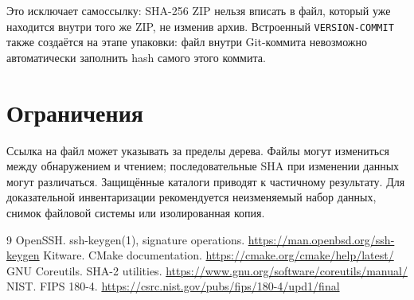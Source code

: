 \documentclass[12pt,a4paper]{article}
\begin{document}
Это исключает самоссылку: SHA-256 ZIP нельзя вписать в файл, который
уже находится внутри того же ZIP, не изменив архив. Встроенный
\texttt{VERSION-COMMIT} также создаётся на этапе упаковки: файл внутри
Git-коммита невозможно автоматически заполнить hash самого этого коммита.

\section{Ограничения}

Ссылка на файл может указывать за пределы дерева.
Файлы могут измениться между обнаружением и чтением; последовательные SHA
при изменении данных могут различаться. Защищённые каталоги приводят к
частичному результату. Для доказательной инвентаризации рекомендуется
неизменяемый набор данных, снимок файловой системы или изолированная копия.

\begin{thebibliography}{9}
 OpenSSH. ssh-keygen(1), signature operations. \url{https://man.openbsd.org/ssh-keygen}
 Kitware. CMake documentation. \url{https://cmake.org/cmake/help/latest/}
 GNU Coreutils. SHA-2 utilities. \url{https://www.gnu.org/software/coreutils/manual/}
 NIST. FIPS 180-4. \url{https://csrc.nist.gov/pubs/fips/180-4/upd1/final}
\end{thebibliography}
\end{document}
